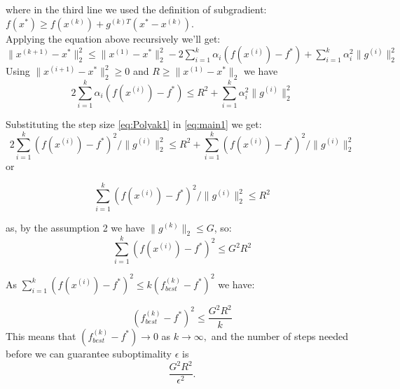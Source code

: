 \documentclass{article}
\begin{document}
where in the third line we used the definition of subgradient: \\ $f(x^*) \geq f(x^{(k)}) + g^{(k)T}(x^* - x^{(k)}).$ \\
Applying the equation above recursively we'll get:\\
$\lVert x^{(k+1)} - x^* \rVert_2^2 \leq 
\lVert x^{(1)}  - x^* \rVert_2^2 - 
2 \sum_{i = 1}^k \alpha_i (f(x^{(i)})  - f^*) + 
\sum_{i = 1}^k \alpha_i^2 \lVert g^{(i)} \rVert_2^2$ \\

Using $\lVert x^{(i+1)} - x^* \rVert_2^2 \geq 0$ and 
$R \geq \lVert x^{(1)} - x^* \rVert_2$ we have \\

\begin{equation}\label{eq:main1}
2 \sum_{i = 1}^k \alpha_i (f(x^{(i)})  - f^*) \leq 
R^2 + 
\sum_{i = 1}^k \alpha_i^2 \lVert g^{(i)} \rVert_2^2
\end{equation}

Substituting the step size \ref{eq:Polyak1} in \ref{eq:main1} we get:\\

\begin{equation*}
	2 \sum_{i = 1}^k (f(x^{(i)})  - f^*)^2 
	/ \lVert g^{(i)} \rVert_2^2 \leq 
	R^2 + 
	 \sum_{i = 1}^k (f(x^{(i)})  - f^*)^2 
	/ \lVert g^{(i)} \rVert_2^2 
\end{equation*}
or 

\begin{equation*}
\sum_{i = 1}^k (f(x^{(i)})  - f^*)^2 
/ \lVert g^{(i)} \rVert_2^2 \leq 
	R^2
\end{equation*}

as, by the assumption 2 we have 
$ \lVert g^{(k)}\rVert _2 \leq G$, so:\\

\begin{equation*}
	\sum_{i = 1}^k (f(x^{(i)})  - f^*)^2 
	 \leq G^2 R^2
\end{equation*}

As $\sum_{i = 1}^k (f(x^{(i)})  - f^*)^2  \leq 
k (f_{best}^{(k)} - f^*)^2$ we have:

\begin{equation*}
(f_{best}^{(k)} - f^*)^2
\leq \frac{G^2 R^2}{k}
\end{equation*}
This means that 
$(f_{best}^{(k)} - f^*) \rightarrow 0$ as $k \rightarrow \infty,$ and the number of steps needed before we can guarantee suboptimality $\epsilon$ is 
$$\frac{G^2 R^2}{\epsilon ^2}.$$
\end{document}
